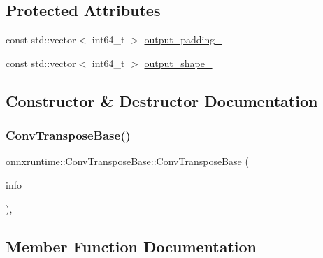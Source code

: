 \subsection*{Protected Attributes}
\begin{DoxyCompactItemize}
\item 
const std\+::vector$<$ int64\+\_\+t $>$ \mbox{\hyperlink{classonnxruntime_1_1ConvTransposeBase_a22c5311310fb05d751163a532a3ff888}{output\+\_\+padding\+\_\+}}
\item 
const std\+::vector$<$ int64\+\_\+t $>$ \mbox{\hyperlink{classonnxruntime_1_1ConvTransposeBase_aecdb70a060732461de425a07f978c455}{output\+\_\+shape\+\_\+}}
\end{DoxyCompactItemize}


\subsection{Constructor \& Destructor Documentation}
\mbox{\label{classonnxruntime_1_1ConvTransposeBase_a48c752373100fe1f75d3e609de6cc844}} 
\subsubsection{\texorpdfstring{Conv\+Transpose\+Base()}{ConvTransposeBase()}}
{\footnotesize\ttfamily onnxruntime\+::\+Conv\+Transpose\+Base\+::\+Conv\+Transpose\+Base (\begin{DoxyParamCaption}\item[{const \mbox{\hyperlink{classonnxruntime_1_1OpKernelInfo}{Op\+Kernel\+Info}} \&}]{info }\end{DoxyParamCaption})\hspace{0.3cm}{\ttfamily [inline]}, {\ttfamily [protected]}}



\subsection{Member Function Documentation}
\mbox{\label{classonnxruntime_1_1ConvTransposeBase_a35d55f24a17b9b296359aeb5e8bdfc44}} 
